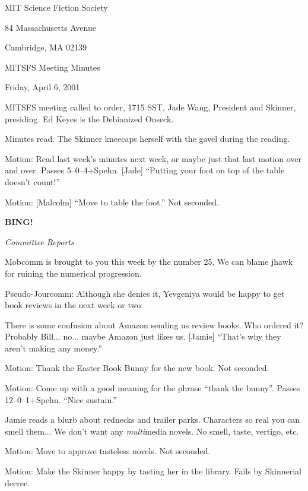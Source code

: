 \documentclass[12pt]{article}
\newcommand{\bing}{{\bf BING!} }
\newcommand{\goto}[1]{\bing \vskip 12pt \centerline{{\em{#1}}}}
\begin{document}
\begin{center}

MIT Science Fiction Society 

84 Massachusetts Avenue

Cambridge, MA 02139

\vspace{12pt}

MITSFS Meeting Minutes 

Friday, April 6, 2001

\end{center}
 
\vspace{18pt}

\setlength{\parskip}{6pt}

\noindent
MITSFS meeting called to order, 1715 SST, Jade Wang, President and
Skinner, presiding.  Ed Keyes is the Debianized Onseck.

Minutes read.  The Skinner kneecaps herself with the gavel during
the reading.

Motion: Read last week's minutes next week, or maybe just that last
motion over and over.  Passes 5--0--4+Spehn.  [Jade] ``Putting your
foot on top of the table doesn't count!''

Motion: [Malcolm] ``Move to table the foot.''  Not seconded.

\goto{Committee Reports}

Mobcomm is brought to you this week by the number 25.  We can blame
jhawk for ruining the numerical progression.

Pseudo-Jourcomm: Although she denies it, Yevgeniya would be happy to
get book reviews in the next week or two.

There is some confusion about Amazon sending us review books.  Who
ordered it?  Probably Bill... no... maybe Amazon just likes us.
[Jamie] ``That's why they aren't making any money.''

Motion: Thank the Easter Book Bunny for the new book.  Not seconded.

Motion: Come up with a good meaning for the phrase ``thank the bunny''.
Passes 12--0--1+Spehn.  ``Nice sustain.''

Jamie reads a blurb about rednecks and trailer parks.  Characters so
real you can smell them...  We don't want any {\em multi}media novels.
No smell, taste, vertigo, etc.

Motion: Move to approve tasteless novels.  Not seconded.

Motion: Make the Skinner happy by tasting her in the library.  Fails
by Skinnerial decree.
\end{document}
